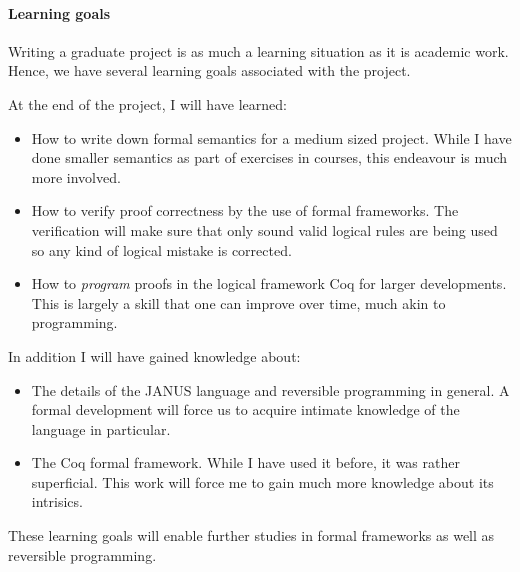 \documentclass[a4paper, oneside, 10pt, draft]{memoir}
\begin{document}
\paragraph{Learning goals}

Writing a graduate project is as much a learning situation as it is
academic work. Hence, we have several learning goals associated with
the project.

At the end of the project, I will have learned:
\begin{itemize}
\item How to write down formal semantics for a medium sized
  project. While I have done smaller semantics as part of exercises in
  courses, this endeavour is much more involved.
\item How to verify proof correctness by the use of formal
  frameworks. The verification will make sure that only sound valid
  logical rules are being used so any kind of logical mistake is
  corrected.
\item How to \emph{program} proofs in the logical framework Coq for
  larger developments. This is largely a skill that one can improve
  over time, much akin to programming.
\end{itemize}
In addition I will have gained knowledge about:
\begin{itemize}
\item The details of the JANUS language and reversible programming in
  general. A formal development will force us to acquire intimate
  knowledge of the language in particular.
\item The Coq formal framework. While I have used it before, it was
  rather superficial. This work will force me to gain much more
  knowledge about its intrisics.
\end{itemize}

These learning goals will enable further studies in formal frameworks
as well as reversible programming.

 
\end{document}
